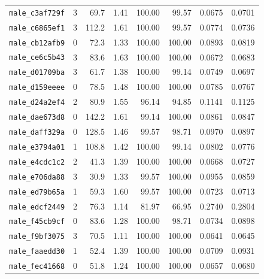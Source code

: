 \documentclass[11pt]{article}
\begin{document}
\begin{longtable}{lrrrrrrr}
\texttt{male\_c3af729f} & 3 & 69.7 & 1.41 & 100.00 & 99.57 & 0.0675 & 0.0701 \\
\texttt{male\_c6865ef1} & 3 & 112.2 & 1.61 & 100.00 & 99.57 & 0.0774 & 0.0736 \\
\texttt{male\_cb12afb9} & 0 & 72.3 & 1.33 & 100.00 & 100.00 & 0.0893 & 0.0819 \\
\texttt{male\_ce6c5b43} & 3 & 83.6 & 1.63 & 100.00 & 100.00 & 0.0672 & 0.0683 \\
\texttt{male\_d01709ba} & 3 & 61.7 & 1.38 & 100.00 & 99.14 & 0.0749 & 0.0697 \\
\texttt{male\_d159eeee} & 0 & 78.5 & 1.48 & 100.00 & 100.00 & 0.0785 & 0.0767 \\
\texttt{male\_d24a2ef4} & 2 & 80.9 & 1.55 & 96.14 & 94.85 & 0.1141 & 0.1125 \\
\texttt{male\_dae673d8} & 0 & 142.2 & 1.61 & 99.14 & 100.00 & 0.0861 & 0.0847 \\
\texttt{male\_daff329a} & 0 & 128.5 & 1.46 & 99.57 & 98.71 & 0.0970 & 0.0897 \\
\texttt{male\_e3794a01} & 1 & 108.8 & 1.42 & 100.00 & 99.14 & 0.0802 & 0.0776 \\
\texttt{male\_e4cdc1c2} & 2 & 41.3 & 1.39 & 100.00 & 100.00 & 0.0668 & 0.0727 \\
\texttt{male\_e706da88} & 3 & 30.9 & 1.33 & 99.57 & 100.00 & 0.0955 & 0.0859 \\
\texttt{male\_ed79b65a} & 1 & 59.3 & 1.60 & 99.57 & 100.00 & 0.0723 & 0.0713 \\
\texttt{male\_edcf2449} & 2 & 76.3 & 1.14 & 81.97 & 66.95 & 0.2740 & 0.2804 \\
\texttt{male\_f45cb9cf} & 0 & 83.6 & 1.28 & 100.00 & 98.71 & 0.0734 & 0.0898 \\
\texttt{male\_f9bf3075} & 3 & 70.5 & 1.11 & 100.00 & 100.00 & 0.0641 & 0.0645 \\
\texttt{male\_faaedd30} & 1 & 52.4 & 1.39 & 100.00 & 100.00 & 0.0709 & 0.0931 \\
\texttt{male\_fec41668} & 0 & 51.8 & 1.24 & 100.00 & 100.00 & 0.0657 & 0.0680 \\
\end{longtable}\endgroup
\end{document}
